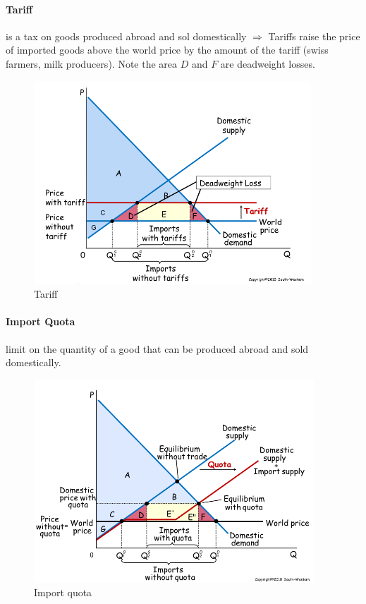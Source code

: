 \documentclass[a4paper,titlepage] {scrartcl}
\begin{document}
\paragraph{Tariff} %
\label{par:tariff} 
is a tax on goods produced abroad and sol domestically $\Rightarrow$ Tariffs raise the price of imported goods above the world price by the amount of the tariff (swiss farmers, milk producers). Note the area $D$ and $F$ are deadweight losses. 
\begin{figure}[htbp]
	\centering
		\includegraphics[height=3in]{images/tariff.png}
	\caption{Tariff}
	\label{fig:images_tariff}
\end{figure}

\paragraph{Import Quota} %
\label{par:import_quota}
 limit on the quantity of a good that can be 
produced abroad and sold domestically.
\begin{figure}[htbp]
	\centering
		\includegraphics[height=3in]{images/importquota.png}
	\caption{Import quota}
	\label{fig:images_importquota}
\end{figure}
\end{document}
